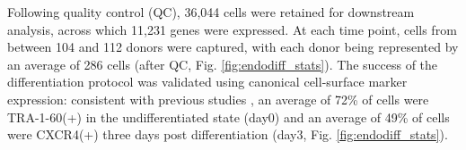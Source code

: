 Following quality control (QC), 36,044 cells were retained for downstream analysis, across which 11,231 genes were expressed.
At each time point, cells from between 104 and 112 donors were captured, with each donor being represented by an average of 286 cells (after QC, Fig. \ref{fig:endodiff_stats}). 
The success of the differentiation protocol was validated using canonical cell-surface marker expression: consistent with previous studies \cite{chu2016single}, an average of 72\% of cells were TRA-1-60(+) in the undifferentiated state (day0) and an average of 49\% of cells were CXCR4(+) three days post differentiation (day3, Fig. \ref{fig:endodiff_stats}).
 
